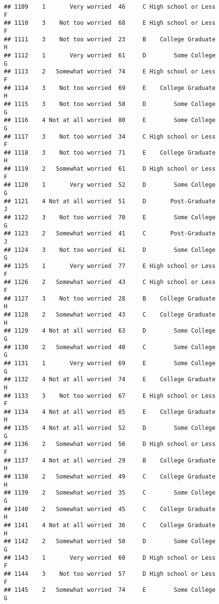 \documentclass[
]{article}
\begin{document}
\begin{verbatim}
## 1109    1       Very worried  46     C High school or Less         F
## 1110    3    Not too worried  68     E High school or Less         F
## 1111    3    Not too worried  23     B    College Graduate         H
## 1112    1       Very worried  61     D        Some College         G
## 1113    2   Somewhat worried  74     E High school or Less         F
## 1114    3    Not too worried  69     E    College Graduate         H
## 1115    3    Not too worried  58     D        Some College         G
## 1116    4 Not at all worried  80     E        Some College         G
## 1117    3    Not too worried  34     C High school or Less         F
## 1118    3    Not too worried  71     E    College Graduate         H
## 1119    2   Somewhat worried  61     D High school or Less         F
## 1120    1       Very worried  52     D        Some College         G
## 1121    4 Not at all worried  51     D       Post-Graduate         J
## 1122    3    Not too worried  70     E        Some College         G
## 1123    2   Somewhat worried  41     C       Post-Graduate         J
## 1124    3    Not too worried  61     D        Some College         G
## 1125    1       Very worried  77     E High school or Less         F
## 1126    2   Somewhat worried  43     C High school or Less         F
## 1127    3    Not too worried  28     B    College Graduate         H
## 1128    2   Somewhat worried  43     C    College Graduate         H
## 1129    4 Not at all worried  63     D        Some College         G
## 1130    2   Somewhat worried  40     C        Some College         G
## 1131    1       Very worried  69     E        Some College         G
## 1132    4 Not at all worried  74     E    College Graduate         H
## 1133    3    Not too worried  67     E High school or Less         F
## 1134    4 Not at all worried  85     E    College Graduate         H
## 1135    4 Not at all worried  52     D        Some College         G
## 1136    2   Somewhat worried  56     D High school or Less         F
## 1137    4 Not at all worried  29     B    College Graduate         H
## 1138    2   Somewhat worried  49     C    College Graduate         H
## 1139    2   Somewhat worried  35     C        Some College         G
## 1140    2   Somewhat worried  45     C    College Graduate         H
## 1141    4 Not at all worried  36     C    College Graduate         H
## 1142    2   Somewhat worried  50     D        Some College         G
## 1143    1       Very worried  60     D High school or Less         F
## 1144    3    Not too worried  57     D High school or Less         F
## 1145    2   Somewhat worried  74     E        Some College         G

\end{verbatim}
\end{document}
